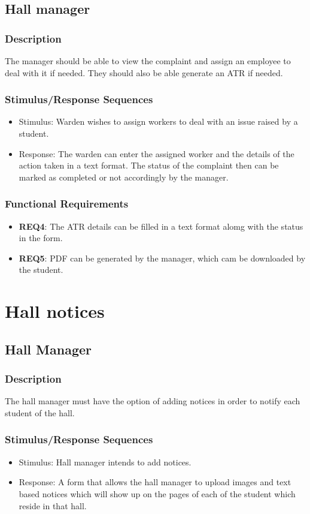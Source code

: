 \documentclass{scrreprt}
\begin{document}
\subsection{Hall manager}
\subsubsection{Description}
The manager should be able to view the complaint and assign an employee to deal with it if needed. They should also be able generate an ATR if needed.
\subsubsection{Stimulus/Response Sequences}
\begin{itemize}
    \item Stimulus: Warden wishes to assign workers to deal with an issue raised by a student. 
    \item Response: The warden can enter the assigned worker and the details of the action taken in a text format. The status of the complaint then can be marked as completed or not accordingly by the manager. 
\end{itemize}

\subsubsection{Functional Requirements}
\begin{itemize}
    \item \textbf{REQ4}: The ATR details can be filled in a text format alomg with the status in the form.
    \item \textbf{REQ5}: PDF can be generated by the manager, which cam be downloaded by the student.
\end{itemize}

\section{Hall notices}
\subsection{Hall Manager}
\subsubsection{Description}
The hall manager must have the option of adding notices in order to notify each student of the hall.
\subsubsection{Stimulus/Response Sequences}
\begin{itemize}
    \item Stimulus: Hall manager intends to add notices.
    \item Response: A form that allows the hall manager to upload images and text based notices which will show up on the pages of each of the student which reside in that hall.
\end{itemize}
\end{document}
